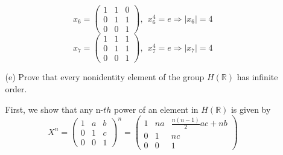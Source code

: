 \documentclass[12pt]{article}
\begin{document}
\begin{enumerate}
\begin{enumerate}
\begin{mybox}
            $$x_6=\left(\begin{array}{ccc}
                    1 & 1 & 0\\
                    0 & 1 & 1\\
                    0 & 0 & 1 \end{array}
                \right),\ \ x_6^4=e\Longrightarrow |x_6|=4$$
            $$x_7=\left(\begin{array}{ccc}
                    1 & 1 & 1\\
                    0 & 1 & 1\\
                    0 & 0 & 1 \end{array}
                \right),\ \ x_7^4=e\Longrightarrow |x_7|=4$$
        \end{mybox}

        \item[(e)] Prove that every nonidentity element of the
        group $H(\mathbb{R})$ has infinite order.
        \begin{mybox}
            
            First, we show that any n-$th$ power of an
            element in $H(\mathbb{R})$ is given by
            $$X^n=\left(\begin{array}{ccc}
                1 & a & b\\
                0 & 1 & c\\
                0 & 0 & 1 \end{array}
            \right)^n=\left(\begin{array}{ccc}
                1 & na & \frac{n(n-1)}{2}ac+nb\\
                0 & 1 & nc\\
                0 & 0 & 1 \end{array}
            \right)$$


\end{mybox}
\end{enumerate}
\end{enumerate}
\end{document}
